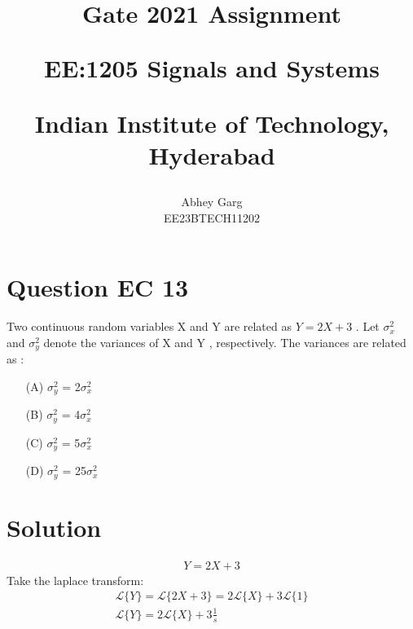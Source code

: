 \documentclass[journal,12pt,onecolumn]{IEEEtran}
\theoremstyle{remark}
\begin{document}
%




\vspace{3cm}

\title{
Gate 2021 Assignment 

\large{EE:1205 Signals and Systems}

Indian Institute of Technology, Hyderabad
}
\author{Abhey Garg

EE23BTECH11202
}	


\maketitle





\renewcommand{\thefigure}{\theenumi}
\renewcommand{\thetable}{\theenumi}

\section{Question EC 13}
Two continuous random variables X and Y are related as $Y = 2X+3$ . Let $\sigma_x^2 $ and $\sigma_y^2 $ denote the variances of X and Y , respectively. The variances are related as :
\begin{enumerate}
\item[(A)] $\sigma_y^2 $ = 2$\sigma_x^2$
\item[(B)] $\sigma_y^2 $ = 4$\sigma_x^2$
\item[(C)] $\sigma_y^2 $ = 5$\sigma_x^2$
\item[(D)] $\sigma_y^2 $ = 25$\sigma_x^2$
\end{enumerate}
\section{Solution}
\begin{align}
Y = 2X+3
\end{align}
Take the laplace transform:
\begin{align}
\mathcal{L}\{Y\} = \mathcal{L}\{2X + 3\} = 2\mathcal{L}\{X\} + 3\mathcal{L}\{1\}\\
\mathcal{L}\{Y\} = 2\mathcal{L}\{X\} + 3 \frac{1}{s}
\end{align}
\end{document}

